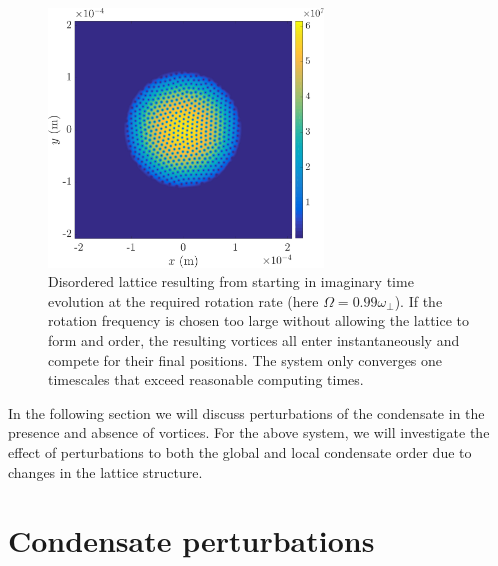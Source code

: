 \begin{figure}
    \centering
    \includegraphics[width=0.65\textwidth]{Images/ch4_vtx/toofast_099_1e7}
    \caption{Disordered lattice resulting from starting in imaginary time evolution at the required rotation rate (here $\Omega=0.99\omega_\perp$). If the rotation frequency is chosen too large without allowing the lattice to form and order, the resulting vortices all enter instantaneously and compete for their final positions. The system only converges one timescales that exceed reasonable computing times.}
    \label{fig:malformed_lattice}
\end{figure}

In the following section we will discuss perturbations of the condensate in the presence and absence of vortices. For the above system, we will investigate the effect of perturbations to both the global and local condensate order due to changes in the lattice structure.

\section{Condensate perturbations}
